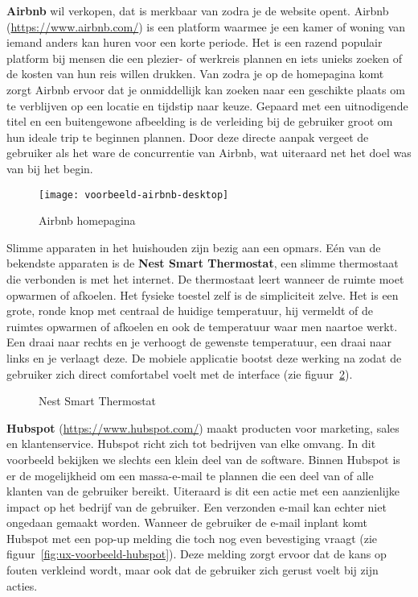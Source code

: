 \textbf{Airbnb} wil verkopen, dat is merkbaar van zodra je de website opent. Airbnb (\url{https://www.airbnb.com/}) is een platform waarmee je een kamer of woning van iemand anders kan huren voor een korte periode. Het is een razend populair platform bij mensen die een plezier- of werkreis plannen en iets unieks zoeken of de kosten van hun reis willen drukken. Van zodra je op de homepagina komt zorgt Airbnb ervoor dat je onmiddellijk kan zoeken naar een geschikte plaats om te verblijven op een locatie en tijdstip naar keuze. Gepaard met een uitnodigende titel en een buitengewone afbeelding is de verleiding bij de gebruiker groot om hun ideale trip te beginnen plannen. Door deze directe aanpak vergeet de gebruiker als het ware de concurrentie van Airbnb, wat uiteraard net het doel was van bij het begin.

\begin{figure}
    \centering
    \texttt{[image: voorbeeld-airbnb-desktop]}
    \caption[Voorbeeld Airbnb]{Airbnb homepagina}
    \label{fig:ux-voorbeeld-airbnb}
\end{figure}

Slimme apparaten in het huishouden zijn bezig aan een opmars. Eén van de bekendste apparaten is de \textbf{Nest Smart Thermostat}, een slimme thermostaat die verbonden is met het internet. De thermostaat leert wanneer de ruimte moet opwarmen of afkoelen. Het fysieke toestel zelf is de simpliciteit zelve. Het is een grote, ronde knop met centraal de huidige temperatuur, hij vermeldt of de ruimtes opwarmen of afkoelen en ook de temperatuur waar men naartoe werkt. Een draai naar rechts en je verhoogt de gewenste temperatuur, een draai naar links en je verlaagt deze. De mobiele applicatie bootst deze werking na zodat de gebruiker zich direct comfortabel voelt met de interface (zie figuur~\ref{fig:ux-voorbeeld-nest}).

\begin{figure}
    \centering
    \qquad
    \caption[Voorbeeld Nest Smart Thermostat]{Nest Smart Thermostat}
    \label{fig:ux-voorbeeld-nest}
\end{figure}

\textbf{Hubspot} (\url{https://www.hubspot.com/}) maakt producten voor marketing, sales en klantenservice. Hubspot richt zich tot bedrijven van elke omvang. In dit voorbeeld bekijken we slechts een klein deel van de software. Binnen Hubspot is er de mogelijkheid om een massa-e-mail te plannen die een deel van of alle klanten van de gebruiker bereikt. Uiteraard is dit een actie met een aanzienlijke impact op het bedrijf van de gebruiker. Een verzonden e-mail kan echter niet ongedaan gemaakt worden. Wanneer de gebruiker de e-mail inplant komt Hubspot met een pop-up melding die toch nog even bevestiging vraagt (zie figuur~\ref{fig:ux-voorbeeld-hubspot}). Deze melding zorgt ervoor dat de kans op fouten verkleind wordt, maar ook dat de gebruiker zich gerust voelt bij zijn acties.

